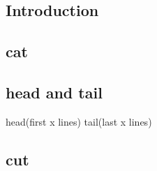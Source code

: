 
\subsection{Introduction}
 

\subsection{cat}

\subsection{head and tail}
head(first x lines)
tail(last x lines)

\subsection{cut}
